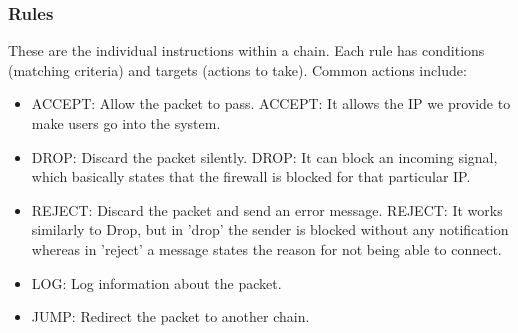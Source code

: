 \subsubsection{Rules} 
These are the individual instructions within a chain. 
Each rule has conditions (matching criteria) and targets (actions to take). Common actions include:
\begin{itemize}
    \item ACCEPT: Allow the packet to pass. 
    ACCEPT: It allows the IP we provide to make users go into the system.
    \item DROP: Discard the packet silently. 
    DROP: It can block an incoming signal, which basically states that the firewall is blocked for that particular IP.
    \item REJECT: Discard the packet and send an error message. 
    REJECT: It works similarly to Drop, but in 'drop' the sender is blocked without any notification whereas in 'reject' a message states the reason for not being able to connect.
    \item LOG: Log information about the packet.
    \item JUMP: Redirect the packet to another chain.
\end{itemize} 

